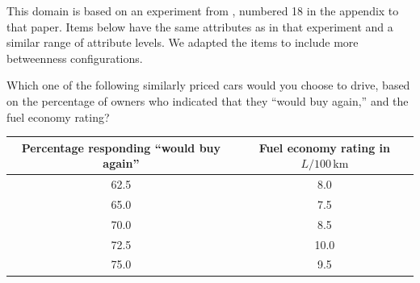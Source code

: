 This domain is based on an experiment from \citet{WedePett96}, numbered 18 in the appendix to that paper.
Items below have the same attributes as in that experiment and a similar range of attribute levels.
We adapted the items to include more betweenness configurations.

\begin{tcolorbox}
Which one of the following similarly priced cars would you choose to drive, based on the percentage of owners who indicated that they ``would buy again,'' and the fuel economy rating?

\begin{tabular}{cc}
\hline
Percentage responding ``would buy again'' & Fuel economy rating in $L/100\,\mathrm{km}$ \\ \hline
62.5 & 8.0 \\ 
65.0 & 7.5 \\ 
70.0 & 8.5 \\ 
72.5 & 10.0 \\ 
75.0 & 9.5 \\ \hline
\end{tabular}
\end{tcolorbox}
